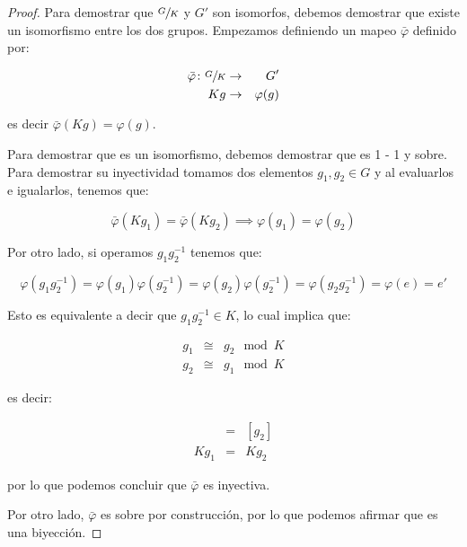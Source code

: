         \begin{proof}
            Para demostrar que $\sfrac{G}{K}$ y $G'$ son isomorfos, debemos demostrar que existe un isomorfismo entre los dos grupos. Empezamos definiendo un mapeo $\bar{\varphi}$ definido por:

            \begin{eqnarray*}
                \bar{\varphi} \colon \sfrac{G}{K} & \to & G' \\
                Kg & \to & \varphi(g)
            \end{eqnarray*}

            es decir $\bar{\varphi}(Kg) = \varphi(g)$.

            Para demostrar que es un isomorfismo, debemos demostrar que es 1 - 1 y sobre.
            Para demostrar su inyectividad tomamos dos elementos $g_1, g_2 \in G$ y al evaluarlos e igualarlos, tenemos que:

            \begin{equation*}
                \bar{\varphi}(Kg_1) = \bar{\varphi}(Kg_2) \implies \varphi(g_1) = \varphi(g_2)
            \end{equation*}

            Por otro lado, si operamos $g_1 g_2^{-1}$ tenemos que:

            \begin{equation*}
                \varphi(g_1 g_2^{-1}) = \varphi(g_1) \varphi(g_2^{-1}) = \varphi(g_2) \varphi(g_2^{-1}) = \varphi(g_2 g_2^{-1}) = \varphi(e) = e'
            \end{equation*}

            Esto es equivalente a decir que $g_1 g_2^{-1} \in K$, lo cual implica que:

            \begin{eqnarray*}
                g_1 & \cong & g_2 \mod K \\
                g_2 & \cong & g_1 \mod K
            \end{eqnarray*}

            es decir:

            \begin{eqnarray*}
                [g_1] & = & [g_2] \\
                Kg_1 & = & Kg_2
            \end{eqnarray*}

            por lo que podemos concluir que $\bar{\varphi}$ es inyectiva.

            Por otro lado, $\bar{\varphi}$ es sobre por construcción, por lo que podemos afirmar que es una biyección.
        \end{proof}

